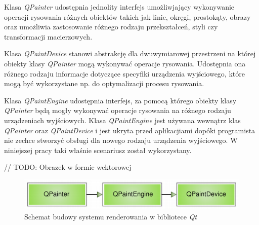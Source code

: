 Klasa \emph{QPainter} udostępnia jednolity interfejs umożliwjający wykonywanie operacji rysowania różnych obiektów takich jak linie, okręgi, prostokąty, obrazy oraz umożliwia zastosowanie różnego rodzaju przekształceń, styli czy transformacji macierzowych. 

Klasa \emph{QPaintDevice} stanowi abstrakcję dla dwuwymiarowej przestrzeni na której obiekty klasy \emph{QPainter} mogą wykonywać operacje rysowania. Udostępnia ona różnego rodzaju informacje dotyczące specyfiki urządzenia wyjściowego, które mogą być wykorzystane np. do optymalizacji procesu rysowania. 

Klasa \emph{QPaintEngine} udostępnia interfejs, za pomocą którego obiekty klasy \emph{QPainter} będą mogły wykonywać operacje rysowania na różnego rodzaju urządzeniach wyjściowych. Klasa \emph{QPaintEngine} jest używana wewnątrz klas \emph{QPainter} oraz \emph{QPaintDevice} i jest ukryta przed aplikacjiami dopóki programista nie zechce stworzyć obsługi dla nowego rodzaju urządzenia wyjściowego. W niniejszej pracy taki właśnie scenariusz został wykorzystany.
 
// TODO: Obrazek w formie wektorowej

\begin{figure}[!h]
  \centering
  \includegraphics[width=\textwidth,height=!]{img/paintsystem-core.png}
  \caption{Schemat budowy systemu renderowania w bibliotece \emph{Qt}}
  \label{paintsystem-core}
\end{figure}
